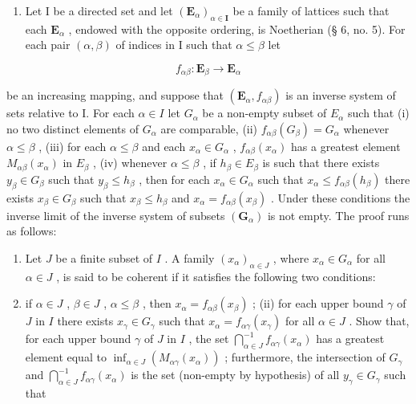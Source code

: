 \begin{enumerate}
\def\labelenumi{\arabic{enumi}.}
\setcounter{enumi}{4}
\tightlist
\item
  Let I be a directed set and let \((\mathbf{E}_{\alpha})_{\alpha \in \mathbf{I}}\) be a family of lattices such that each \(\mathbf{E}_{\alpha}\) , endowed with the opposite ordering, is Noetherian (§ 6, no. 5). For each pair \((\alpha, \beta)\) of indices in I such that \(\alpha \leqslant \beta\) let
\end{enumerate}

\[
f _ {\alpha \beta}: \mathbf {E} _ {\beta} \rightarrow \mathbf {E} _ {\alpha}
\]

be an increasing mapping, and suppose that \((\mathbf{E}_{\alpha}, f_{\alpha\beta})\) is an inverse system of sets relative to I. For each \(\alpha \in I\) let \(G_{\alpha}\) be a non-empty subset of \(E_{\alpha}\) such that (i) no two distinct elements of \(G_{\alpha}\) are comparable, (ii) \(f_{\alpha\beta}(G_{\beta}) = G_{\alpha}\) whenever \(\alpha \leqslant \beta\) , (iii) for each \(\alpha \leqslant \beta\) and each \(x_{\alpha} \in G_{\alpha}\) , \(f_{\alpha\beta}(x_{\alpha})\) has a greatest element \(M_{\alpha\beta}(x_{\alpha})\) in \(E_{\beta}\) , (iv) whenever \(\alpha \leqslant \beta\) , if \(h_{\beta} \in E_{\beta}\) is such that there exists \(y_{\beta} \in G_{\beta}\) such that \(y_{\beta} \leqslant h_{\beta}\) , then for each \(x_{\alpha} \in G_{\alpha}\) such that \(x_{\alpha} \leqslant f_{\alpha\beta}(h_{\beta})\) there exists \(x_{\beta} \in G_{\beta}\) such that \(x_{\beta} \leqslant h_{\beta}\) and \(x_{\alpha} = f_{\alpha\beta}(x_{\beta})\) . Under these conditions the inverse limit of the inverse system of subsets \((\mathbf{G}_{\alpha})\) is not empty. The proof runs as follows:

\begin{enumerate}
\def\labelenumi{(\alph{enumi})}
\item
  Let \(J\) be a finite subset of \(I\) . A family \((x_{\alpha})_{\alpha \in J}\) , where \(x_{\alpha} \in G_{\alpha}\) for all \(\alpha \in J\) , is said to be coherent if it satisfies the following two conditions:
\item
  if \(\alpha \in J\) , \(\beta \in J\) , \(\alpha \leqslant \beta\) , then \(x_{\alpha} = f_{\alpha \beta}(x_{\beta})\) ; (ii) for each upper bound \(\gamma\) of \(J\) in \(I\) there exists \(x_{\gamma} \in G_{\gamma}\) such that \(x_{\alpha} = f_{\alpha \gamma}(x_{\gamma})\) for all \(\alpha \in J\) . Show that, for each upper bound \(\gamma\) of \(J\) in \(I\) , the set \(\bigcap_{\alpha \in J}^{-1} f_{\alpha \gamma}(x_{\alpha})\) has a greatest element equal to \(\inf_{\alpha \in J} (M_{\alpha \gamma}(x_{\alpha}))\) ; furthermore, the intersection of \(G_{\gamma}\) and \(\bigcap_{\alpha \in J}^{-1} f_{\alpha \gamma}(x_{\alpha})\) is the set (non-empty by hypothesis) of all \(y_{\gamma} \in G_{\gamma}\) such that
\end{enumerate}

